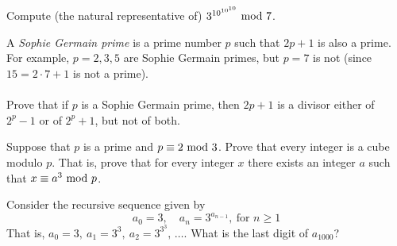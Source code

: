 \begin{problem}\label{Problem 11.1}
Compute (the natural representative of) $3^{10^{10^{10}}}\text{ mod }{7}$.
\end{problem}

\vspace{0.1in}

\begin{problem}\label{Problem 11.2}
A \emph{Sophie Germain prime} is a prime number $p$ such that $2p + 1$ is also a prime. For example, $p = 2, 3, 5$ are Sophie Germain primes, but $p = 7$ is not (since $15 = 2\cdot 7 + 1$ is not a prime).\\
\\
Prove that if $p$ is a Sophie Germain prime, then $2p + 1$ is a divisor either of $2^p - 1$ or of $2^p + 1$, but not of both.
\end{problem}

\vspace{0.1in}

\begin{problem}\label{Problem 11.3}
Suppose that $p$ is a prime and $p \equiv 2\text{ mod }{3}$. Prove that every integer is a cube modulo $p$. That is, prove that for every integer $x$ there exists an integer $a$ such that $x \equiv a^3\text{ mod }{p}$.
\end{problem}

\vspace{0.1in}

\begin{problem}\label{Problem 11.4}
Consider the recursive sequence given by
\[a_0 = 3,\quad a_n = 3^{a_{n-1}},\ \text{for $n\geq 1$}\]
That is, $a_0 = 3,\ a_1 = 3^3,\ a_2 = 3^{3^3},\,\ldots$. What is the last digit of $a_{1000}$?
\end{problem}
